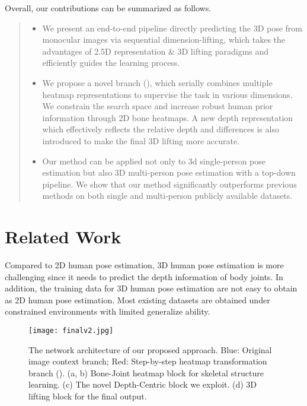 \documentclass[letterpaper]{article} \usepackage{aaai21}  \usepackage{times}  \usepackage{helvet} \usepackage{courier}  \usepackage[hyphens]{url}  \usepackage{graphicx} \urlstyle{rm} \def\UrlFont{\rm}  \usepackage{natbib}  \usepackage{caption} \frenchspacing  \setlength{\pdfpagewidth}{8.5in}  \setlength{\pdfpageheight}{11in}
\begin{document}
Overall, our contributions can be summarized as follows.

\begin{quote}
\begin{itemize}
\item We present an end-to-end pipeline directly predicting the 3D pose from monocular images via sequential dimension-lifting, which takes the advantages of 2.5D representation \& 3D lifting paradigms and efficiently guides the learning process. 

\item We propose a novel branch (), which serially combines multiple heatmap representations to supervise the task in various dimensions. We constrain the search space and increase robust human prior information through 2D bone heatmaps. A new depth representation which effectively reflects the relative depth and differences is also introduced to make the final 3D lifting more accurate.

\item Our method can be applied not only to 3d single-person pose estimation but also 3D multi-person pose estimation with a top-down pipeline. We show that our method significantly outperforms previous methods on both single and multi-person publicly available datasets. 

\end{itemize}
\end{quote}

\section{Related Work}

Compared to 2D human pose estimation, 3D human pose estimation is more challenging since it needs to predict the depth information of body joints. In addition, the training data for 3D human pose estimation are not easy to obtain as 2D human pose estimation. Most existing datasets are obtained under constrained environments with limited generalize ability. 

\begin{figure*}[htbp]
\centering
\texttt{[image: finalv2.jpg]}
\caption{The network architecture of our proposed approach. Blue: Original image context branch; Red: Step-by-step heatmap transformation branch (). (a, b) Bone-Joint heatmap block for skeletal structure learning. (c) The novel Depth-Centric block we exploit. (d) 3D lifting block for the final output.}
\label{fig2}
\end{figure*}
\end{document}
